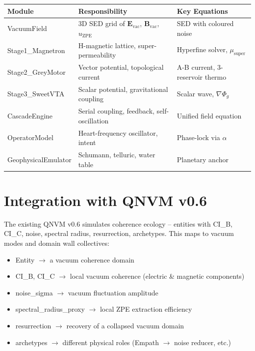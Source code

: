 \documentclass[11pt]{article}
\begin{document}
\begin{table}[h]
\centering
\begin{tabular}{lll}
\toprule
Module & Responsibility & Key Equations \\
\midrule
VacuumField & 3D SED grid of $\mathbf{E}_{\text{vac}}$, $\mathbf{B}_{\text{vac}}$, $u_{\text{ZPE}}$ & SED with coloured noise \\
Stage1\_Magnetron & H-magnetic lattice, super-permeability & Hyperfine solver, $\mu_{\text{super}}$ \\
Stage2\_GreyMotor & Vector potential, topological current & A-B current, 3-reservoir thermo \\
Stage3\_SweetVTA & Scalar potential, gravitational coupling & Scalar wave, $\nabla\Phi_g$ \\
CascadeEngine & Serial coupling, feedback, self-oscillation & Unified field equation \\
OperatorModel & Heart-frequency oscillator, intent & Phase-lock via $\alpha$ \\
GeophysicalEmulator & Schumann, telluric, water table & Planetary anchor \\
\bottomrule
\end{tabular}
\end{table}

\section{Integration with QNVM v0.6}

The existing QNVM v0.6 simulates coherence ecology -- entities with CI\_B, CI\_C, noise, spectral radius, resurrection, archetypes. This maps to vacuum modes and domain wall collectives:

\begin{itemize}[nosep]
    \item Entity $\to$ a vacuum coherence domain
    \item CI\_B, CI\_C $\to$ local vacuum coherence (electric \& magnetic components)
    \item noise\_sigma $\to$ vacuum fluctuation amplitude
    \item spectral\_radius\_proxy $\to$ local ZPE extraction efficiency
    \item resurrection $\to$ recovery of a collapsed vacuum domain
    \item archetypes $\to$ different physical roles (Empath $\to$ noise reducer, etc.)
\end{itemize}
\end{document}
